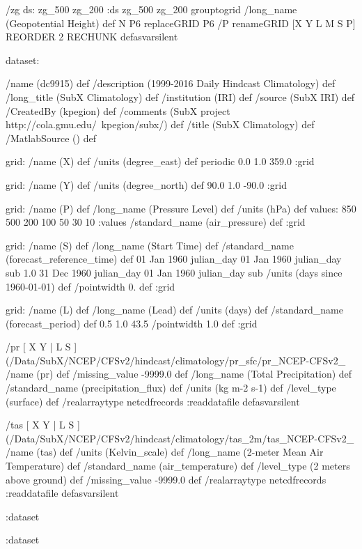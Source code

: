 /zg {
ds: zg_500 zg_200 :ds
{ zg_500 zg_200 } grouptogrid
/long_name (Geopotential Height) def
N P6 replaceGRID
P6 /P renameGRID
[X Y L M S P] REORDER
2 RECHUNK
} defasvarsilent
\begin{ingrid}

 dataset:

 /name (dc9915) def
 /description (1999-2016 Daily Hindcast Climatology) def
 /long_title (SubX Climatology) def
 /institution (IRI) def
 /source (SubX IRI) def
 /CreatedBy (kpegion) def
 /comments (SubX project http://cola.gmu.edu/~kpegion/subx/) def
 /title (SubX Climatology) def
 /MatlabSource () def

 grid:
 /name (X) def
 /units (degree_east) def
 periodic
 0.0 1.0 359.0
 :grid

 grid:
 /name (Y) def
 /units (degree_north) def
 90.0 1.0 -90.0
 :grid

 grid:
 /name (P) def
 /long_name (Pressure Level) def
 /units (hPa) def
 values: 850 500 200 100 50 30 10 :values
 /standard_name (air_pressure) def
 :grid

 grid:
 /name (S) def
 /long_name (Start Time) def
 /standard_name (forecast_reference_time) def
 01 Jan 1960 julian_day 01 Jan 1960 julian_day sub
 1.0
 31 Dec 1960 julian_day 01 Jan 1960 julian_day sub
 /units (days since 1960-01-01) def
 /pointwidth 0. def
 :grid

 grid:
 /name (L) def
 /long_name (Lead) def
 /units (days) def
 /standard_name (forecast_period) def
 0.5 1.0 43.5
 /pointwidth 1.0 def
 :grid

 /pr{
 [ X Y | L S ] (/Data/SubX/NCEP/CFSv2/hindcast/climatology/pr_sfc/pr_NCEP-CFSv2_%
 /name (pr) def
 /missing_value -9999.0 def
 /long_name (Total Precipitation) def
 /standard_name (precipitation_flux) def
 /units (kg m-2 s-1) def
 /level_type (surface) def
 /realarraytype netcdfrecords :readdatafile
 }defasvarsilent

 /tas{
 [ X Y | L S ] (/Data/SubX/NCEP/CFSv2/hindcast/climatology/tas_2m/tas_NCEP-CFSv2_%
 /name (tas) def
 /units (Kelvin_scale) def
 /long_name (2-meter Mean Air Temperature) def
 /standard_name (air_temperature) def
 /level_type (2 meters above ground) def
 /missing_value -9999.0 def
 /realarraytype netcdfrecords :readdatafile
 }defasvarsilent

 :dataset

:dataset
\end{ingrid}
